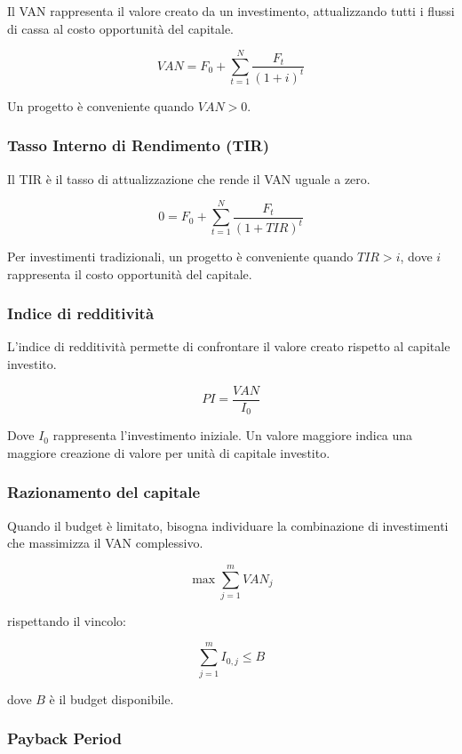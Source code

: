 \noindent Il VAN rappresenta il valore creato da un investimento,
attualizzando tutti i flussi di cassa al costo opportunità del capitale.

\[
\boxed{
VAN=F_0+\sum_{t=1}^{N}\frac{F_t}{(1+i)^t}
}
\]

\noindent Un progetto è conveniente quando $VAN>0$.

\subsubsection*{Tasso Interno di Rendimento (TIR)}

\noindent Il TIR è il tasso di attualizzazione che rende il VAN uguale a zero.

\[
\boxed{
0=F_0+\sum_{t=1}^{N}\frac{F_t}{(1+TIR)^t}
}
\]

\noindent Per investimenti tradizionali, un progetto è conveniente
quando $TIR>i$, dove $i$ rappresenta il costo opportunità del capitale.

\subsubsection*{Indice di redditività}

\noindent L'indice di redditività permette di confrontare il valore
creato rispetto al capitale investito.

\[
\boxed{
PI=\frac{VAN}{I_0}
}
\]

\noindent Dove $I_0$ rappresenta l'investimento iniziale.
Un valore maggiore indica una maggiore creazione di valore
per unità di capitale investito.

\subsubsection*{Razionamento del capitale}

\noindent Quando il budget è limitato, bisogna individuare
la combinazione di investimenti che massimizza il VAN complessivo.

\[
\boxed{
\max \sum_{j=1}^{m} VAN_j
}
\]

\noindent rispettando il vincolo:

\[
\boxed{
\sum_{j=1}^{m} I_{0,j}\leq B
}
\]

\noindent dove $B$ è il budget disponibile.

\subsubsection*{Payback Period}

